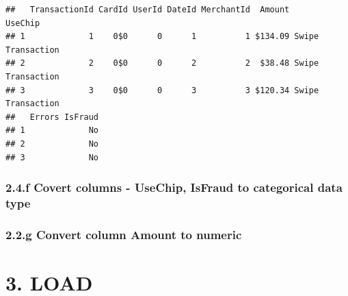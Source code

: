 \documentclass[
]{article}
\newenvironment{Shaded}{\begin{snugshade}}{\end{snugshade}}
\newcommand{\FunctionTok}[1]{\textcolor[rgb]{0.13,0.29,0.53}{\textbf{#1}}}
\newcommand{\NormalTok}[1]{#1}
\newcommand{\OtherTok}[1]{\textcolor[rgb]{0.56,0.35,0.01}{#1}}
\newcommand{\SpecialCharTok}[1]{\textcolor[rgb]{0.81,0.36,0.00}{\textbf{#1}}}
\newcommand{\StringTok}[1]{\textcolor[rgb]{0.31,0.60,0.02}{#1}}
\begin{document}
\begin{verbatim}
##   TransactionId CardId UserId DateId MerchantId  Amount           UseChip
## 1             1    0$0      0      1          1 $134.09 Swipe Transaction
## 2             2    0$0      0      2          2  $38.48 Swipe Transaction
## 3             3    0$0      0      3          3 $120.34 Swipe Transaction
##   Errors IsFraud
## 1             No
## 2             No
## 3             No
\end{verbatim}

\subsubsection{2.4.f Covert columns - UseChip, IsFraud to categorical
data
type}\label{f-covert-columns---usechip-isfraud-to-categorical-data-type}

\begin{Shaded}
\end{Shaded}

\subsubsection{2.2.g Convert column Amount to
numeric}\label{g-convert-column-amount-to-numeric}

\begin{Shaded}
\end{Shaded}

\section{3. LOAD}\label{load}
\end{document}
